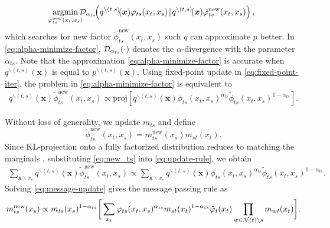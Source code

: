 \begin{equation}\label{eq:alpha-minimize-factor}
  \!\!\!\uargmin{\tilde{\phi}_{ts}^{\mathrm{new}}(x_t, x_s)}\!\!\!\!
  \Dd_{\alpha_{ts}}\!\!\left( q^{\backslash (t,s)}\!(\bm{x}){\phi}_{ts}(x_t, x_s)
    \|q^{\backslash (t,s)}\!(\bm{x})\tilde{\phi}_{ts}^{\mathrm{new}}(x_t, x_s) \right),
\end{equation}
which searches for new factor $\tilde{\phi}_{ts}^{\mathrm{new}}(x_t, x_s)$ such $q$ can approximate $p$ better. In \eqref{eq:alpha-minimize-factor}, $\mathcal{D}_{\alpha_{ts}}(\cdot)$ denotes the $\alpha$-divergence with the parameter $\alpha_{ts}$. Note that the approximation \eqref{eq:alpha-minimize-factor} is accurate when $q^{\backslash (t,s)}(\bm{x})$ is equal to $p^{\backslash (t,s)}(\bm{x})$. 
Using fixed-point update in \eqref{eq:fixed-point-iter}, the problem in \eqref{eq:alpha-minimize-factor} is equivalent to
\begin{align}\label{eq:update-rule}
  q^{\backslash (t,s)}(\bm{x})\tilde{\phi}_{ts}^{\mathrm{new}}(x_t, x_s) \propto
  \mathrm{proj}\left[ q^{\backslash
  (t,s)}(\bm{x}){\phi}_{ts}(x_t, x_s)^{\alpha_{ts}} \tilde{\phi}_{ts}(x_t, x_s)^{1-\alpha_{ts}} \right]. 
\end{align}

Without loss of generality, we update $m_{ts}$ and define
\begin{equation}\label{eq:new_ts}
  \tilde{\phi}_{ts}^{\mathrm{new}}(x_t, x_s) = m_{ts}^{\mathrm{new}}(x_s) m_{st}(x_t).
\end{equation}
Since KL-projection onto a fully factorized distribution reduces to matching the marginals \cite[Proposition~8.3]{koller2009pgm}, substituting \eqref{eq:new_ts} into \eqref{eq:update-rule}, we obtain
\begin{align}\label{eq:message-update}
  \sum_{\bm{x}\backslash x_s} q^{\backslash (t,s)}(\bm{x}) \tilde{\phi}_{ts}^{\mathrm{new}}(x_t, x_s) 
  \propto \sum_{\bm{x}\backslash x_s} q^{\backslash (t,s)}(\bm{x}) \phi_{ts}(x_t, x_s)^{\alpha_{ts}} \tilde{\phi}_{ts}(x_t, x_s)^{1-\alpha_{ts}}.
\end{align}
Solving \eqref{eq:message-update} gives the message passing rule as
\begin{align}\label{eq:message-rule-pairwise}
  {m}^{\text{new}}_{ts}(x_s) \propto  m_{ts}(x_s)^{1-\alpha_{ts}} \bigg[\sum_{x_t} \varphi_{ts}(x_t, x_s)^{\alpha_{ts}} {m}_{st}(x_t)^{1-\alpha_{ts}}\tilde{\varphi}_t(x_t) \prod_{w\in \mathcal{N}(t)\backslash s}m_{wt}(x_t) \bigg].
\end{align}

